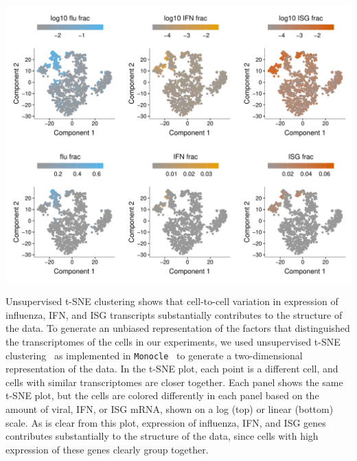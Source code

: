 \documentclass[lineno]{asm-article}
\begin{document}
\begin{suppfig}
\includegraphics[width=\textwidth]{figures/single_cell_figures/p_tsne.pdf}
\caption{
Unsupervised t-SNE clustering shows that cell-to-cell variation in expression of influenza, IFN, and ISG transcripts substantially contributes to the structure of the data.
To generate an unbiased representation of the factors that distinguished the transcriptomes of the cells in our experiments, we used unsupervised t-SNE clustering~\cite{maaten2008visualizing} as implemented in \texttt{Monocle}~\cite{qiu2017reversed, trapnell2014dynamics} to generate a two-dimensional representation of the data.
In the t-SNE plot, each point is a different cell, and cells with similar transcriptomes are closer together.
Each panel shows the same t-SNE plot, but the cells are colored differently in each panel based on the amount of viral, IFN, or ISG mRNA, shown on a log (top) or linear (bottom) scale.
As is clear from this plot, expression of influenza, IFN, and ISG genes contributes substantially to the structure of the data, since cells with high expression of these genes clearly group together.
}
\label{suppfig:tSNE}
\end{suppfig}
\end{document}

